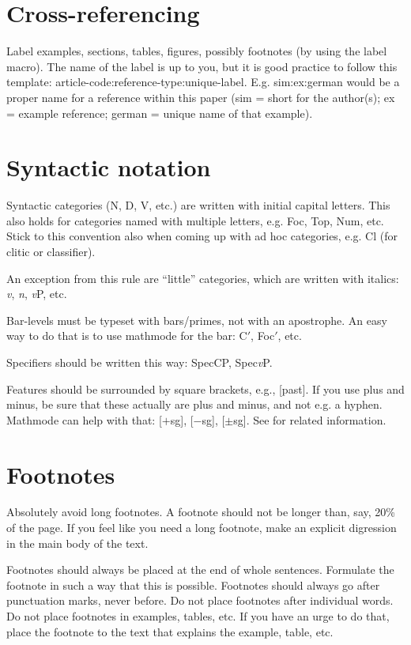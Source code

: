 \section{Cross-referencing}

Label examples, sections, tables, figures, possibly footnotes (by using the label macro). The name of the label is up to you, but it is good practice to follow this template: article-code:reference-type:unique-label. E.g. sim:ex:german would be a proper name for a reference within this paper (sim = short for the author(s); ex = example reference; german = unique name of that example).

\section{Syntactic notation}

Syntactic categories (N, D, V, etc.) are written with initial capital letters. This also holds for categories named with multiple letters, e.g. Foc, Top, Num, etc. Stick to this convention also when coming up with ad hoc categories, e.g. Cl (for clitic or classifier).

An exception from this rule are ``little'' categories, which are written with italics: \textit{v}, \textit{n}, \textit{v}P, etc.

Bar-levels must be typeset with bars/primes, not with an apostrophe. An easy way to do that is to use mathmode for the bar: C$'$, Foc$'$, etc.

Specifiers should be written this way: SpecCP, Spec\textit{v}P.

Features should be surrounded by square brackets, e.g., [past]. If you use plus and minus, be sure that these actually are plus and minus, and not e.g. a hyphen. Mathmode can help with that: [$+$sg], [$-$sg], [$\pm$sg]. See  for related information.

\section{Footnotes}

Absolutely avoid long footnotes. A footnote should not be longer than, say, {20\%} of the page. If you feel like you need a long footnote, make an explicit digression in the main body of the text.

Footnotes should always be placed at the end of whole sentences. Formulate the footnote in such a way that this is possible. Footnotes should always go after punctuation marks, never before. Do not place footnotes after individual words. Do not place footnotes in examples, tables, etc. If you have an urge to do that, place the footnote to the text that explains the example, table, etc.


